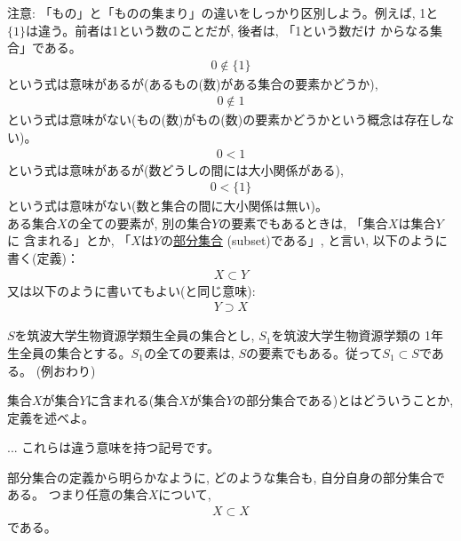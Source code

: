 注意: 「もの」と「ものの集まり」の違いをしっかり区別しよう。例えば, 
1と$\{1\}$は違う。前者は1という数のことだが, 後者は, 「1という数だけ
からなる集合」である。
\begin{eqnarray}
0\notin \{1\}
\end{eqnarray}
という式は意味があるが(あるもの(数)がある集合の要素かどうか), 
\begin{eqnarray}
0\notin 1
\end{eqnarray}
という式は意味がない(もの(数)がもの(数)の要素かどうかという概念は存在しない)。
\begin{eqnarray}
0 < 1
\end{eqnarray}
という式は意味があるが(数どうしの間には大小関係がある), 
\begin{eqnarray}
0< \{1\}
\end{eqnarray}
という式は意味がない(数と集合の間に大小関係は無い)。
\\

ある集合$X$の全ての要素が, 別の集合$Y$の要素でもあるときは, 「集合$X$は集合$Y$に
含まれる」とか, 「$X$は$Y$の\underline{部分集合}
(subset)である」, と言い, 以下のように書く(定義)：
\begin{eqnarray}X \subset Y\label{eq:subset001}\end{eqnarray}
又は以下のように書いてもよい(と同じ意味):
\begin{eqnarray}Y \supset X\end{eqnarray}

\begin{exmpl} $S$を筑波大学生物資源学類生全員の集合とし, $S_1$を筑波大学生物資源学類の
1年生全員の集合とする。$S_1$の全ての要素は, $S$の要素でもある。従って$S_1\subset S$である。
(例おわり)\end{exmpl}
\mv

\begin{q}\label{q:alg_subset001}
集合$X$が集合$Y$に含まれる(集合$X$が集合$Y$の部分集合である)とはどういうことか, 定義を述べよ。
\end{q}\mv

\begin{freqmiss}{\small{} ... 
これらは違う意味を持つ記号です。}\end{freqmiss}

部分集合の定義から明らかなように, どのような集合も, 自分自身の部分集合である。
つまり任意の集合$X$について, 
\begin{eqnarray}
X \subset X
\end{eqnarray}
である。

